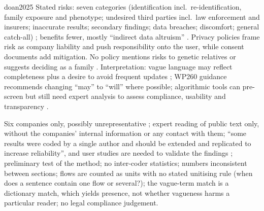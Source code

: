 \begin{papercard}{doan2025}
 Stated risks: seven categories (identification incl.\ re-identification, family exposure and phenotype; undesired third parties incl.\ law enforcement and insurers; inaccurate results; secondary findings; data breaches; discomfort; general catch-all) ; benefits fewer, mostly ``indirect data altruism'' . Privacy policies frame risk as company liability and push responsibility onto the user, while consent documents add mitigation. No policy mentions risks to genetic relatives or suggests deciding as a family . Interpretation: vague language may reflect completeness plus a desire to avoid frequent updates ; WP260 guidance recommends changing ``may'' to ``will'' where possible; algorithmic tools can pre-screen but still need expert analysis to assess compliance, usability and transparency .

 Six companies only, possibly unrepresentative ; expert reading of public text only, without the companies' internal information or any contact with them; ``some results were coded by a single author and should be extended and replicated to increase reliability'', and user studies are needed to validate the findings ; preliminary test of the method; no inter-coder statistics; numbers inconsistent between sections; flows are counted as units with no stated unitising rule (when does a sentence contain one flow or several?); the vague-term match is a dictionary match, which yields presence, not whether vagueness harms a particular reader; no legal compliance judgement.


\end{papercard}
